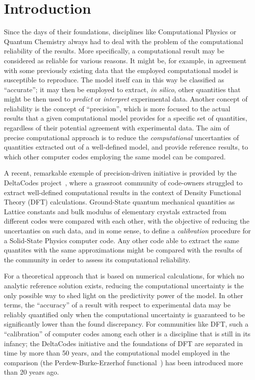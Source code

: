 \documentclass[reprint,aps,prb]{revtex4-1}
\begin{document}
\section{Introduction}
Since the days of their foundations, disciplines like Computational Physics or Quantum Chemistry always had to deal with the problem of the 
computational reliability of the results. More specifically, a computational result may be considered as reliable for various reasons.
It might be, for example, in agreement with some previously existing data that the employed computational model is susceptible to reproduce.
The model itself can in this way be classified as ``accurate''; it may then be employed to extract, \textit{in silico},
other quantities that might be then used to \emph{predict} or \emph{interpret} experimental data.
Another concept of reliability is the concept of  ``precision'', which is more focused to the actual results
that a given computational model provides for a specific set of quantities, regardless of their potential agreement with 
experimental data. The aim of precise computational approach is to reduce the \emph{computational} uncertanties
of quantities extracted out of a well-defined model, and provide reference results, to which other computer codes
employing the same model can be compared.

A recent, remarkable exemple of precision-driven initiative is provided by the DeltaCodes project~\cite{deltaTest2016},
where a grassroot community of code-owners struggled to extract well-defined computational results in the context of 
Density Functional Theory (DFT) calculations. Ground-State quantum mechanical quantities as Lattice constants and bulk modulus of 
elementary crystals extracted from different codes were compared with each other, with the objective of reducing the uncertanties 
on such data, and in some sense, to define a \emph{calibration} procedure for a Solid-State Physics computer code. 
Any other code able to extract the same quantites with the same approximations might be compared with the 
results of the community in order to assess its computational reliability.

For a theoretical approach that is based on numerical calculations, for which no analytic reference solution exists, 
reducing the computational uncertainty is the only possible way to shed light on the predictivity power of the
model. In other terms, the ``accuracy'' of a result with respect to experimental data may be reliably quantified
only when the computational uncertainty is guaranteed to be significantly lower than the found discrepancy.
For communities like DFT, such a ``calibration'' of computer codes among each other is a discipline that is still in its infancy;
the DeltaCodes initiative and the foundations of DFT are separated in time by more than 50 years, and the computational
model employed in the comparison (the Perdew-Burke-Erzerhof functional~\cite{PBE}) has been introduced more than 20 years ago.
\end{document}
